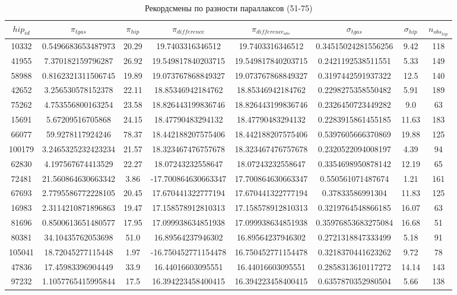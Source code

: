 \documentclass[14pt]{article} %
\begin{document}
\begin{landscape}
\begin{spacing}{1.0}
\begin{table}[h]
\caption{Рекордсмены по разности параллаксов (51-75)}
\label{tabular:75_75}
\begin{tabular}{|c|c|c|c|c|c|c|c|}
\hline 	
$hip_{id}$ &$\pi_{tgas}$ &$\pi_{hip}$ &$\pi_{difference}$ &$\pi_{difference_{abs}}$ &$\sigma_{tgas}$ &$\sigma_{hip}$ &$n_{obs_{hip}}$\\
\hline 
10332&0.5496683653487973&20.29&19.7403316346512&19.7403316346512&0.34515024281556256&9.42&118\\
41955&7.370182159796287&26.92&19.549817840203715&19.549817840203715&0.2421192538511551&5.33&149\\
58988&0.8162321311506745&19.89&19.073767868849327&19.073767868849327&0.3197442591937322&12.5&140\\
42652&3.256530578152378&22.11&18.85346942184762&18.85346942184762&0.2298275358550482&5.91&189\\
75262&4.753556800163254&23.58&18.826443199836746&18.826443199836746&0.2326450723449282&9.0&63\\
15691&5.67209516705868&24.15&18.47790483294132&18.47790483294132&0.2283915861455185&11.63&183\\
66077&59.9278117924246&78.37&18.442188207575406&18.442188207575406&0.5397605666370869&19.88&125\\
100179&3.2465325232423234&21.57&18.323467476757678&18.323467476757678&0.2320522094008197&4.39&94\\
62830&4.197567674413529&22.27&18.07243232558647&18.07243232558647&0.3354698950878142&12.19&65\\
72481&21.560864630663342&3.86&-17.700864630663347&17.700864630663347&0.550561071487674&1.21&161\\
67693&2.7795586772228105&20.45&17.670441322777194&17.670441322777194&0.37833586991304&11.83&125\\
16983&2.3114210871896863&19.47&17.158578912810313&17.158578912810313&0.3219764548866185&16.07&63\\
81696&0.8500613651480577&17.95&17.099938634851938&17.099938634851938&0.35976853683275084&16.68&51\\
80381&34.10435762053698&51.0&16.89564237946302&16.89564237946302&0.2721318847333499&5.18&91\\
105041&18.72045277115448&1.97&-16.750452771154478&16.750452771154478&0.3218370441623262&9.72&78\\
47836&17.45983396904449&33.9&16.44016603095551&16.44016603095551&0.2858313610117272&14.14&143\\
97232&1.1057765415995844&17.5&16.394223458400415&16.394223458400415&0.6357870352980504&5.66&138\\

\end{tabular}
\end{table}
\end{spacing}
\end{landscape}
\end{document}
